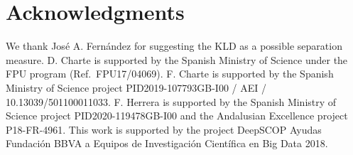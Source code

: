 \documentclass[
	fontsize=11pt, %
	twoside=false, %
	open=any, %
	secnumdepth=1, %
]{kaobook}
\begin{document}
%





  \section*{Acknowledgments}

We thank Jos{\'e} A. Fernández for suggesting the KLD as a possible separation measure. D. Charte is supported by the Spanish Ministry of Science under the FPU program (Ref.~FPU17/04069). F. Charte is supported by the Spanish Ministry of Science project PID2019-107793GB-I00 / AEI / 10.13039/501100011033. F. Herrera is supported by the Spanish Ministry of Science project PID2020-119478GB-I00  and the Andalusian Excellence project P18-FR-4961. This work is supported by the project DeepSCOP Ayudas Fundaci\'on BBVA a Equipos de Investigación Científica en Big Data 2018.


\end{document}
